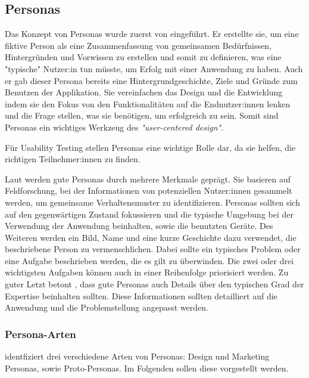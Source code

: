 \subsection{Personas} Das Konzept von Personas wurde zuerst von \textcite{cooperInmatesAre1999}
eingeführt. Er erstellte sie, um eine fiktive Person als eine Zusammenfassung von gemeinsamen
Bedürfnissen, Hintergründen und Vorwissen zu erstellen und somit zu definieren, was eine "typische"
Nutzer:in tun müsste, um Erfolg mit einer Anwendung zu haben. Auch er gab dieser Persona bereits
eine Hintergrundgeschichte, Ziele und Gründe zum Benutzen der Applikation. Sie vereinfachen das
Design und die Entwicklung indem sie den Fokus von den Funktionalitäten auf die Endnutzer:innen
lenken und die Frage stellen, was sie benötigen, um erfolgreich zu sein. Somit sind Personas ein
wichtiges Werkzeug des \textit{"user-centered design"}. \parencite{cooperInmatesAre1999,
tomlinUXOptimization2018}

Für Usability Testing stellen Personas eine wichtige Rolle dar, da sie helfen, die richtigen
Teilnehmer:innen zu finden. \parencite{tomlinUXOptimization2018}

Laut \textcite{tomlinUXOptimization2018} werden gute Personas durch mehrere Merkmale geprägt. Sie
basieren auf Feldforschung, bei der Informationen von potenziellen Nutzer:innen gesammelt werden, um
gemeinsame Verhaltensmuster zu identifizieren. Personas sollten sich auf den gegenwärtigen Zustand
fokussieren und die typische Umgebung bei der Verwendung der Anwendung beinhalten, sowie die
benutzten Geräte. Des Weiteren werden ein Bild, Name und eine kurze Geschichte dazu verwendet, die
beschriebene Person zu vermenschlichen. Dabei sollte ein typisches Problem oder eine Aufgabe
beschrieben werden, die es gilt zu überwinden. Die zwei oder drei wichtigsten Aufgaben können auch
in einer Reihenfolge priorisiert werden. Zu guter Letzt betont \textcite{tomlinUXOptimization2018},
dass gute Personas auch Details über den typischen Grad der Expertise beinhalten sollten. Diese
Informationen sollten detailliert auf die Anwendung und die Problemstellung angepasst werden.
\parencite{tomlinUXOptimization2018}

\subsubsection{Persona-Arten} 

\textcite{tomlinUXOptimization2018} identfiziert drei verschiedene Arten von Personas: Design und
Marketing Personas, sowie Proto-Personas. Im Folgenden sollen diese vorgestellt werden.

